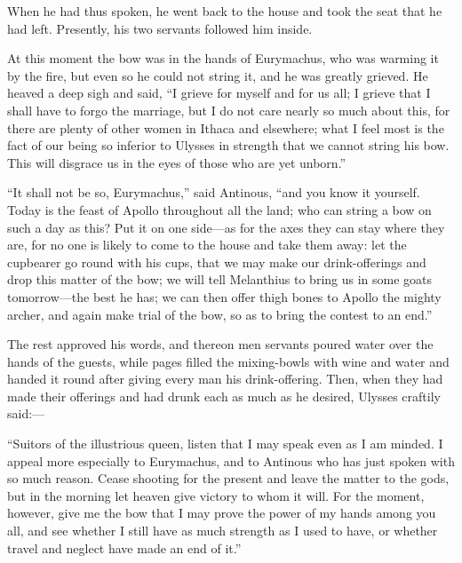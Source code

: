 When he had thus spoken, he went back to the house and took the seat that he
had left. Presently, his two servants followed him inside.

At this moment the bow was in the hands of Eurymachus, who was warming it by
the fire, but even so he could not string it, and he was greatly grieved. He
heaved a deep sigh and said, “I grieve for myself and for us all; I grieve that
I shall have to forgo the marriage, but I do not care nearly so much about
this, for there are plenty of other women in Ithaca and elsewhere; what I feel
most is the fact of our being so inferior to Ulysses in strength that we cannot
string his bow. This will disgrace us in the eyes of those who are yet unborn.”

“It shall not be so, Eurymachus,” said Antinous, “and you know it yourself.
Today is the feast of Apollo throughout all the land; who can string a bow on
such a day as this? Put it on one side—as for the axes they can stay where they
are, for no one is likely to come to the house and take them away: let the
cupbearer go round with his cups, that we may make our drink-offerings and drop
this matter of the bow; we will tell Melanthius to bring us in some goats
tomorrow—the best he has; we can then offer thigh bones to Apollo the mighty
archer, and again make trial of the bow, so as to bring the contest to an end.”

The rest approved his words, and thereon men servants poured water over the
hands of the guests, while pages filled the mixing-bowls with wine and water
and handed it round after giving every man his drink-offering. Then, when they
had made their offerings and had drunk each as much as he desired, Ulysses
craftily said:—

“Suitors of the illustrious queen, listen that I may speak even as I am minded.
I appeal more especially to Eurymachus, and to Antinous who has just spoken
with so much reason. Cease shooting for the present and leave the matter to the
gods, but in the morning let heaven give victory to whom it will. For the
moment, however, give me the bow that I may prove the power of my hands among
you all, and see whether I still have as much strength as I used to have, or
whether travel and neglect have made an end of it.”

